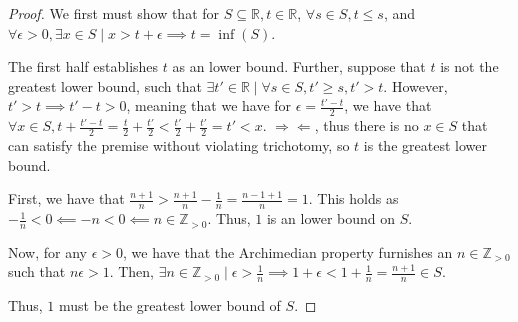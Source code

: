 \documentclass[12pt,letterpaper]{article}
\theoremstyle{definition}
\newcommand{\contra}{\Rightarrow\!\Leftarrow}
\newcommand{\R}{\mathbb{R}}
\newcommand{\Zg}{\mathbb{Z}_{>0}}
\begin{document}
\begin{proof}
  We first must show that for $S \subseteq \R, t \in \R$, $\forall s \in S, t
  \leq s$, and $\forall \epsilon > 0, \exists x \in S \mid x  > t + \epsilon \implies t = \inf(S)$.

  The first half establishes $t$ as an lower bound. Further,
  suppose that $t$ is not the greatest lower bound, such that $\exists t' \in \R \mid
  \forall s \in S, t' \geq s, t' > t$. However, $t' > t \implies t' - t > 0$,
  meaning that we have for $\epsilon = \frac{t' - t}{2}$, we have that $\forall x \in
  S, t + \frac{t' - t}{2} = \frac{t}{2} + \frac{t'}{2} < \frac{t'}{2} +
  \frac{t'}{2} = t' < x$. $\contra$, thus there is no $x \in S$ that can satisfy
  the premise without violating trichotomy, so $t$ is the greatest lower bound.

  First, we have that $\frac{n+1}{n} > \frac{n+1}{n} - \frac{1}{n} =
  \frac{n-1+1}{n} = 1$. This holds as $-\frac{1}{n} < 0 \impliedby -n < 0
  \impliedby n \in \Zg$. Thus, $1$ is an lower bound on $S$.

  Now, for any $\epsilon > 0$, we have that the Archimedian property furnishes an
  $n \in \Zg$ such that $n\epsilon > 1$. Then, $\exists n \in \Zg \mid \epsilon >
  \frac{1}{n} \implies 1 + \epsilon < 1 + \frac{1}{n} = \frac{n+1}{n} \in S$. 

  Thus, $1$ must be the greatest lower bound of $S$.
\end{proof}
\end{document}
